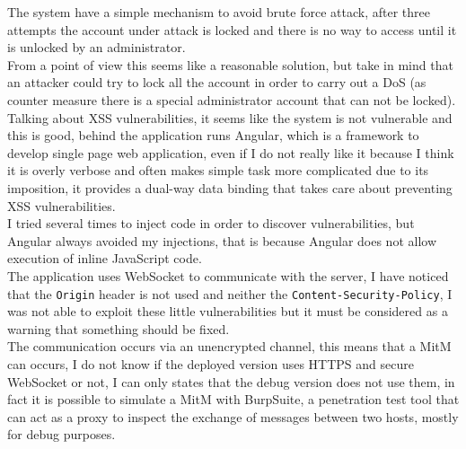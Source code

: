 The system have a simple mechanism to avoid brute force attack, after three attempts the account under attack is locked and there is no way to access
until it is unlocked by an administrator.\\
From a point of view this seems like a reasonable solution, but take in mind that an attacker could try to lock all the account in order to carry out
a DoS (as counter measure there is a special administrator account that can not be locked).\\
Talking about XSS vulnerabilities, it seems like the system is not vulnerable and this is good, behind the application runs Angular, which is a
framework to develop single page web application, even if I do not really like it because I think it is overly verbose and often makes simple task more complicated due to its imposition, it provides a dual-way data binding that takes care about preventing XSS vulnerabilities.\\
I tried several times to inject code in order to discover vulnerabilities, but Angular always avoided my injections, that is because Angular
does not allow execution of inline JavaScript code.\\

The application uses WebSocket to communicate with the server, I have noticed that the \texttt{Origin} header is not used and neither the \texttt{Content-Security-Policy}, I was not able to exploit these little vulnerabilities but it must be considered as a warning that something
should be fixed.\\
The communication occurs via an unencrypted channel, this means that a MitM can occurs, I do not know if the deployed version
uses HTTPS and secure WebSocket or not, I can only states that the debug version does not use them, in fact it is possible to simulate
a MitM with BurpSuite, a penetration test tool that can act as a proxy to inspect the exchange of messages between two hosts, mostly for debug purposes.\\

